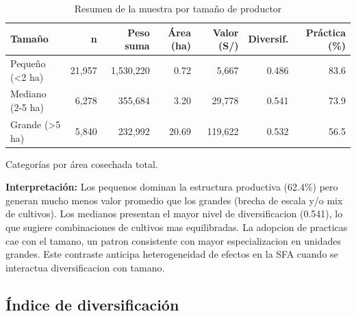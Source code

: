 \documentclass[10pt,a4paper]{article}
\begin{document}
\begin{table}[H]
\centering
\caption{Resumen de la muestra por tamaño de productor}
\label{tab:sample_size}
\begin{threeparttable}
\small
\begin{tabular}{lrrrrrr}
\toprule
\textbf{Tamaño} & \textbf{n} & \textbf{Peso suma} & \textbf{Área (ha)} & \textbf{Valor (S/)} & \textbf{Diversif.} & \textbf{Práctica (\%)} \\
\midrule
Pequeño (<2 ha) & 21,957 & 1,530,220 & 0.72 & 5,667 & 0.486 & 83.6 \\
Mediano (2-5 ha) & 6,278 & 355,684 & 3.20 & 29,778 & 0.541 & 73.9 \\
Grande (>5 ha) & 5,840 & 232,992 & 20.69 & 119,622 & 0.532 & 56.5 \\
\bottomrule
\end{tabular}
\begin{tablenotes}
\footnotesize
\item Categorías por área cosechada total.
\end{tablenotes}
\end{threeparttable}
\end{table}

\textbf{Interpretación:} Los pequenos dominan la estructura productiva (62.4\%) pero generan mucho menos valor promedio que los grandes (brecha de escala y/o mix de cultivos). Los medianos presentan el mayor nivel de diversificacion (0.541), lo que sugiere combinaciones de cultivos mas equilibradas. La adopcion de practicas cae con el tamano, un patron consistente con mayor especializacion en unidades grandes. Este contraste anticipa heterogeneidad de efectos en la SFA cuando se interactua diversificacion con tamano.

\subsection{Índice de diversificación}
\end{document}
